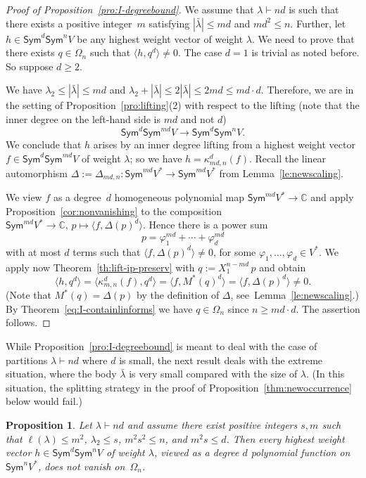 \documentclass[11pt]{amsart}
\def\C{\mathbb{C}}
\def\Sym{\mathsf{Sym}}
\newcommand{\Det}{\Omega}
\def\la{\lambda}
\numberwithin{equation}{section}
\newtheorem{proposition}[theorem]{Proposition}
\begin{document}
\begin{proof}[Proof of Proposition~\ref{pro:I-degreebound}]
We assume that $\la \vdash nd$ is such that there exists a positive integer~$m$ satisfying 
$|\bar{\la}| \le md$ and $md^2\le n$. 
Further, let $h\in\Sym^d\Sym^n V$ be any highest weight vector of weight $\la$.
We need to prove that there exists $q\in\Det_n$ such that
$\langle h,q^d \rangle \ne 0$. 
The case $d=1$ is trivial as noted before. So suppose $d\ge 2$. 

We have $\la_2 \le |\bar{\la}| \le md$ and 
$\la_2 + |\bar{\la}| \le 2 |\bar{\la}| \le 2md \le md\cdot d$.
Therefore, we are in the setting of Proposition~\ref{pro:lifting}(2) 
with respect to the lifting (note that the inner degree on the left-hand side is $md$ and not $d$) 
$$
 \Sym^d\Sym^{md} V \to \Sym^d\Sym^{n} V .
$$ 
We conclude that $h$ arises by an inner degree lifting from 
a highest weight vector~$f\in\Sym^d\Sym^{md} V$ of weight $\la$; 
so we have $h=\kappa^d_{md,n}(f)$. 
Recall the linear automorphism  
$\Delta:=\Delta_{md,n}\colon\Sym^{md} V^* \to \Sym^{md} V^*$ 
from Lemma~\ref{le:newscaling}. 

We view $f$ as a degree~$d$ homogeneous polynomial map $\Sym^{md} V^* \to \C$ and 
apply Proposition~\ref{cor:nonvanishing} to the composition 
$ \Sym^{md} V^* \to \C,\, p\mapsto \langle f, \Delta(p)^d\rangle$.
Hence there is a power sum 
$$
 p = \varphi_1^{md}+\cdots+\varphi_d^{md} 
$$
with at most $d$ terms 
such that $\langle f, \Delta(p)^d \rangle \ne 0$, 
for some $\varphi_1,\ldots,\varphi_{d}\in V^*$. 
We apply now Theorem~\ref{th:lift-ip-preserv} with  $q:=X_1^{n-md}\, p$  
and obtain
$$
  \langle h, q^{d} \rangle = \langle \kappa_{m,n}^d(f), q^{d} \rangle = 
  \langle f, M^*(q)^{d} \rangle =\langle f, \Delta(p)^{d} \rangle \ne 0 .
$$
(Note that $M^*(q) = \Delta(p)$ by the definition of $\Delta$, see~Lemma~\ref{le:newscaling}.) 
By Theorem~\ref{eq:I-containlinforms} we have 
$q\in \Det_n$ since $n\ge md\cdot d$. 
The assertion follows.
\end{proof}

While Proposition~\ref{pro:I-degreebound} is meant to deal with the case 
of partitions $\la \vdash nd$ where $d$ is small, the 
next result deals with the extreme situation, where the body $\bar{\la}$ is very small compared 
with the size of $\la$. 
(In this situation, the splitting strategy in the proof of Proposition~\ref{thm:newoccurrence} 
below would fail.) 

\begin{proposition}\label{thm:verylongfirstrow}
Let $\la\vdash nd$ and assume there exist positive integers $s,m$ such that 
$\ell(\la) \le m^2$, $\la_2 \le s$, $m^2s^2 \le n$, and $m^2 s \le d$. 
Then every highest weight vector $h\in\Sym^d\Sym^n V$ of weight $\la$, 
viewed as a degree $d$ polynomial function on  $\Sym^n V^*$,
does not vanish on~$\Det_n$.   
\end{proposition}
\end{document}
